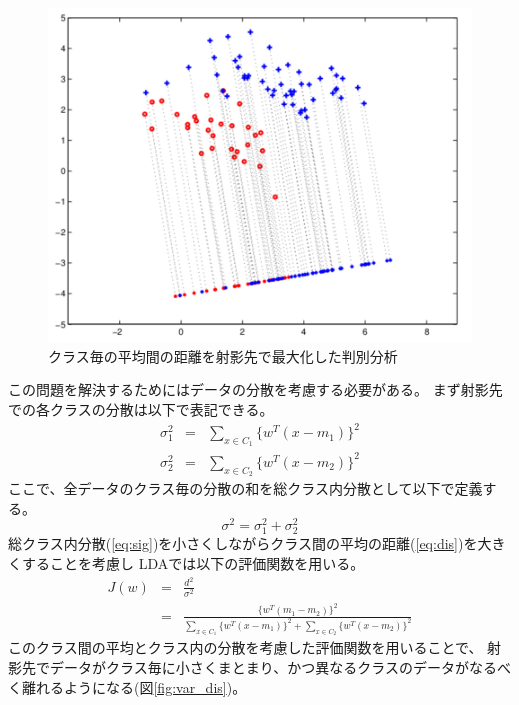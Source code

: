 \begin{figure}
    \centering
    \includegraphics[width=12cm]{images/mean_dis.png}
    \caption{クラス毎の平均間の距離を射影先で最大化した判別分析}
    \label{fig:mean_dis}
\end{figure}
この問題を解決するためにはデータの分散を考慮する必要がある。
まず射影先での各クラスの分散は以下で表記できる。
\begin{eqnarray}
    \sigma^2_{1} & = & \sum_{x\in C_1}\{w^T(x-m_1)\}^2  \\
    \sigma^2_{2} & = & \sum_{x\in C_2}\{w^T(x-m_2)\}^2
\end{eqnarray}
ここで、全データのクラス毎の分散の和を総クラス内分散として以下で定義する。
\begin{equation}
    \sigma^2  = \sigma^2_1 + \sigma^2_2
    \label{eq:sig}
\end{equation}
総クラス内分散(\ref{eq:sig})を小さくしながらクラス間の平均の距離(\ref{eq:dis})を大きくすることを考慮し
LDAでは以下の評価関数を用いる。
\begin{eqnarray}
    J(w) & = & \frac{d^2}{\sigma^2} \nonumber \\
    & = & \frac{\{w^T(m_1-m_2)\}^2}{\sum_{x\in C_1}\{w^T(x-m_1)\}^2 + \sum_{x\in C_2}\{w^T(x-m_2)\}^2}
    \label{eq:lda_obj}
\end{eqnarray}
このクラス間の平均とクラス内の分散を考慮した評価関数を用いることで、
射影先でデータがクラス毎に小さくまとまり、かつ異なるクラスのデータがなるべく離れるようになる(図\ref{fig:var_dis})。
